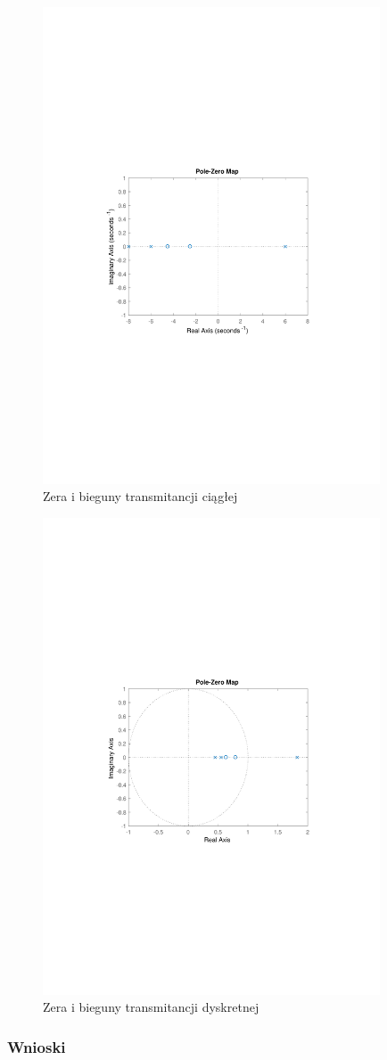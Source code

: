 \documentclass{article}
\begin{document}
\begin{figure}[t]
\centering
\includegraphics[width=10cm]{../rys/rys1}
\caption{Zera i bieguny transmitancji ciągłej}
\label{fig:rys 1}
\end{figure}

\begin{figure}[H]
\centering
\includegraphics[width=10cm]{../rys/rys2}
\caption{Zera i bieguny transmitancji dyskretnej}
\label{fig:rys 2}
\end{figure}

\subsubsection{Wnioski}
\end{document}
